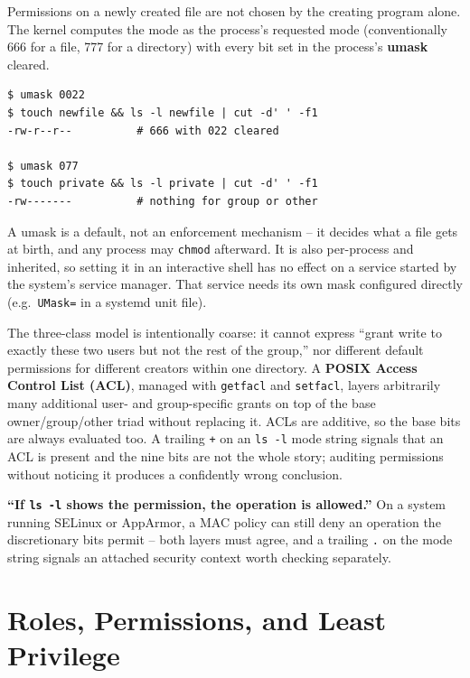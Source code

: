 Permissions on a newly created file are not chosen by the creating program alone. The kernel
computes the mode as the process's requested mode (conventionally 666 for a file, 777 for a
directory) with every bit set in the process's \textbf{umask} cleared.

\begin{lstlisting}[caption={umask determines what new files inherit}]
$ umask 0022
$ touch newfile && ls -l newfile | cut -d' ' -f1
-rw-r--r--          # 666 with 022 cleared

$ umask 077
$ touch private && ls -l private | cut -d' ' -f1
-rw-------          # nothing for group or other
\end{lstlisting}

A umask is a default, not an enforcement mechanism -- it decides what a file gets at birth, and any
process may \texttt{chmod} afterward. It is also per-process and inherited, so setting it in an
interactive shell has no effect on a service started by the system's service manager. That service
needs its own mask configured directly (e.g.\ \texttt{UMask=} in a systemd unit file).

The three-class model is intentionally coarse: it cannot express ``grant write to exactly these two
users but not the rest of the group,'' nor different default permissions for different creators
within one directory. A \textbf{POSIX Access Control List (ACL)}, managed with \texttt{getfacl} and
\texttt{setfacl}, layers arbitrarily many additional user- and group-specific grants on top of the
base owner/group/other triad without replacing it. ACLs are additive, so the base bits are always
evaluated too. A trailing \texttt{+} on an \texttt{ls -l} mode string signals that an ACL is present
and the nine bits are not the whole story; auditing permissions without noticing it produces a
confidently wrong conclusion.

\begin{misconception}
\textbf{``If \texttt{ls -l} shows the permission, the operation is allowed.''} On a system running
SELinux or AppArmor, a MAC policy can still deny an operation the discretionary bits permit -- both
layers must agree, and a trailing \texttt{.} on the mode string signals an attached security context
worth checking separately.
\end{misconception}

\section{Roles, Permissions, and Least Privilege}

